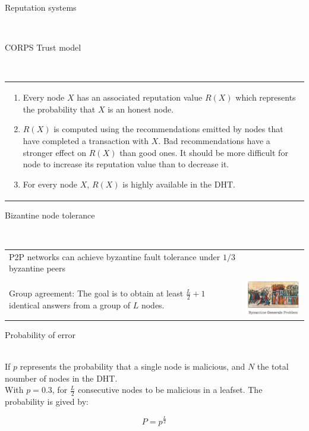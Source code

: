 \documentclass[12pt]{beamer}
\renewcommand{\frametitle}[1]{\vspace{0.2cm}\begin{huge}#1\end{huge}\\}
\renewcommand{\framesubtitle}[1]{\vspace{0.4cm} \hspace{0.4cm}\begin{large}#1\end{large}\\}
\begin{document}
  \begin{frame}
  \frametitle{Reputation systems}
  \framesubtitle{CORPS Trust model}
  \begin{table}
  \begin{tabular}{p{11cm}}
    \begin{enumerate}
      \item Every node $X$ has an associated reputation value $R(X)$
      which represents the probability that $X$ is an honest node.
      \item $R(X)$ is computed using the recommendations emitted
      by nodes that have completed a transaction with $X$. Bad
      recommendations have a stronger effect on $R(X)$ than
      good ones. It should be more difficult for node to
      increase its reputation value than to decrease it.
      \item For every node $X$, $R(X)$ is highly available in the DHT.
    \end{enumerate}
  \end{tabular}
  \end{table}
  \end{frame}
  
  
  \begin{frame}
  \frametitle{Bizantine node tolerance}
  \begin{table}
  \begin{tabular}{p{7cm}p{3cm}}
    P2P networks can achieve byzantine fault tolerance under $1/3$ byzantine
    peers\\

    \\Group agreement:
    The goal is to obtain at least $\frac{L}{2} + 1$ identical answers from a
group of $L$ nodes.
  &
  \vspace{1.5cm}
  \includegraphics[width=4cm]{../../presentacion/img/bizantine_generals_problem}\\
  \end{tabular}
  \end{table}
  \end{frame}

  \begin{frame}
  \frametitle{Probability of error}

      If $p$ represents the probability that a single node is malicious, and
      $N$ the total noumber of nodes in the DHT.\\

      With $p= 0.3$, for   
      $\frac{L}{2}$ consecutive nodes to be malicious in a leafset. The
probability is gived by:

  \begin{equation} \label{eq:p_leafset}
    P= p^{\frac{L}{2}}
  \end{equation}

  \end{frame}
\end{document}
